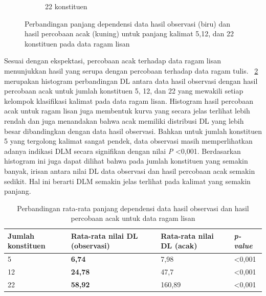 \begin{figure}
\begin{subfigure}{.45\textwidth}
  \caption{22 konstituen}
  \label{fig:l22randomobs} 
\end{subfigure}

\caption{Perbandingan panjang dependensi data hasil observasi (biru) dan hasil percobaan acak (kuning) untuk panjang kalimat 5,12, dan 22 konstituen pada data ragam lisan}
\label{fig:lrandomobs}
\end{figure}

Sesuai dengan ekspektasi, percobaan acak terhadap data ragam lisan menunjukkan hasil yang serupa dengan percobaan terhadap data ragam tulis. \pic~\ref{fig:lrandomobs} merupakan histogram perbandingan DL antara data hasil observasi dengan hasil percobaan acak untuk jumlah konstituen 5, 12, dan 22 yang mewakili setiap kelompok klasifikasi kalimat pada data ragam lisan. Histogram hasil percobaan acak untuk ragam lisan juga membentuk kurva yang secara jelas terlihat lebih rendah dan juga menandakan bahwa  acak memiliki distribusi DL yang lebih besar dibandingkan dengan data hasil observasi. Bahkan untuk jumlah konstituen 5 yang tergolong kalimat sangat pendek, data observasi masih memperlihatkan adanya indikasi DLM secara signifikan dengan nilai \textit{P} \textless 0,001. Berdasarkan histogram ini juga dapat dilihat bahwa pada jumlah konstituen yang semakin banyak, irisan antara nilai DL data observasi dan hasil percobaan acak semakin sedikit. Hal ini berarti DLM semakin jelas terlihat pada kalimat yang semakin panjang.

\begin{table}
\begin{center}
\begin{small}
  \caption{Perbandingan rata-rata panjang dependensi data hasil observasi dan hasil percobaan acak untuk data ragam lisan}  \label{tab:perbandingan_DL_lisan}
  \begin{tabular}{ | l | l | l | l |}
    \hline
	 Jumlah konstituen & Rata-rata nilai DL (observasi) & Rata-rata nilai DL (acak) & \textit{p-value} \\ \hline
	 5 & \textbf{6,74} & 7,98 & \textless 0,001 \\ \hline
	 12 & \textbf{24,78} & 47,7 & \textless 0,001 \\ \hline
	 22 & \textbf{58,92} & 160,89 & \textless 0,001 \\ \hline
  \end{tabular}
  \end{small}
\end{center}
\end{table}

